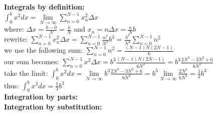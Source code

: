 \documentclass[12pt,a4paper]{report}
\begin{document}
	\textbf{Integrals by definition:}\\
	$\int_{0}^{b} x^2dx = \lim\limits_{N \to \infty} \sum_{n = 0}^{N - 1} x^2_n \Delta x$\\
	where:
	$\Delta x = \frac{b - 0}{N} = \frac{b}{N}$ and $x_n = n \Delta x = \frac{n}{N} b$\\
	rewrite:
	$\sum_{n = 0}^{N - 1} x^2_n \Delta x = \sum_{n = 0}^{N - 1} \frac{n^2}{N^3} b^3 = \frac{b^3}{N^3} \sum_{n = 0}^{N - 1} n^2$\\
	we use the following sum:
	$\sum_{n = 0}^{N - 1} n^2 = \frac{(N-1)N(2N-1)}{6}$\\
	our sum becomes:
	$\sum_{n = 0}^{N - 1} x^2 \Delta x = b^3 \frac{(N-1)N(2N-1)}{6N^3} = b^3 \frac{2N^3 - 3N^2 + 6}{6N^3}$\\
	take the limit:
	$\int_{0}^{b} x^2 dx = \lim\limits_{N \to \infty} b^3 \frac{2N^3 - 3N^2 + 6}{6N^3} = b^3 \lim\limits_{N \to \infty} \frac{2N^3}{6N^3} = \frac{1}{3}b^3$\\
	thus: $\int_{0}^{b} x^2 dx = \frac{1}{3} b^3$\\

	\textbf{Integration by parts:}\\
	
	\textbf{Integration by substitution:}\\
	
\end{document}
